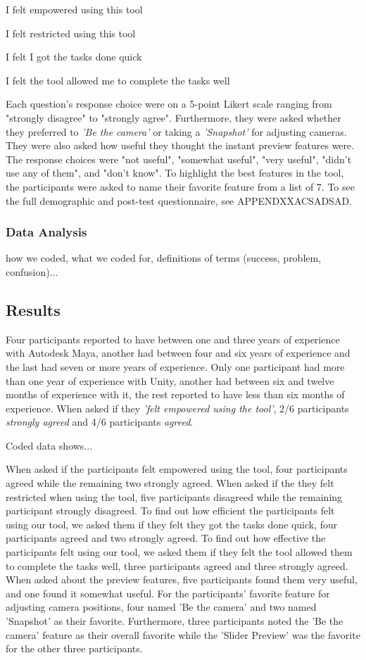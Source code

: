 \setlength{\parindent}{1cm}
I felt empowered using this tool

\setlength{\parskip}{0pt}
I felt restricted using this tool

I felt I got the tasks done quick

I felt the tool allowed me to complete the tasks well

\setlength{\parskip}{15pt}
\noindent
Each question's response choice were on a 5-point Likert scale ranging from "strongly disagree" to "strongly agree". Furthermore, they were asked whether they preferred to \textit{'Be the camera'} or taking a \textit{'Snapshot'} for adjusting cameras. They were also asked how useful they thought the instant preview features were. The response choices were "not useful", "somewhat useful", "very useful", "didn't use any of them", and "don't know". To highlight the best features in the tool, the participants were asked to name their favorite feature from a list of 7. To see the full demographic and post-test questionnaire, see APPENDXXACSADSAD. 

\subsubsection{Data Analysis}
how we coded, what we coded for, definitions of terms (success, problem, confusion)...

\subsection{Results} \label{results}
Four participants reported to have between one and three years of experience with Autodesk Maya, another had between four and six years of experience and the last had seven or more years of experience. Only one participant had more than one year of experience with Unity, another had between six and twelve months of experience with it, the rest reported to have less than six months of experience.
When asked if they \textit{'felt empowered using the tool'}, 2/6 participants \textit{strongly agreed} and 4/6 participants \textit{agreed}.

Coded data shows...

When asked if the participants felt empowered using the tool, four participants agreed while the remaining two strongly agreed. When asked if the they felt restricted when using the tool, five participants disagreed while the remaining participant strongly disagreed. To find out how efficient the participants felt using our tool, we asked them if they felt they got the tasks done quick, four participants agreed and two strongly agreed. To find out how effective the participants felt using our tool, we asked them if they felt the tool allowed them to complete the tasks well, three participants agreed and three strongly agreed.
When asked about the preview features, five participants found them very useful, and one found it somewhat useful. For the participants' favorite feature for adjusting camera positions, four named 'Be the camera' and two named 'Snapshot' as their favorite. Furthermore, three participants noted the 'Be the camera' feature as their overall favorite while the 'Slider Preview' was the favorite for the other three participants. 

